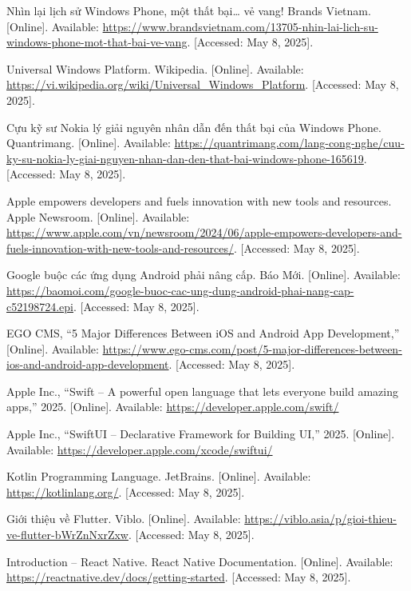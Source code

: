 \documentclass[12pt]{report}
\begin{document}
\begin{thebibliography}{1}
  Nhìn lại lịch sử Windows Phone, một thất bại… vẻ vang! Brands Vietnam. [Online]. Available: \url{https://www.brandsvietnam.com/13705-nhin-lai-lich-su-windows-phone-mot-that-bai-ve-vang}. [Accessed: May 8, 2025].


  Universal Windows Platform. Wikipedia. [Online]. Available: \url{https://vi.wikipedia.org/wiki/Universal_Windows_Platform}. [Accessed: May 8, 2025].


  Cựu kỹ sư Nokia lý giải nguyên nhân dẫn đến thất bại của Windows Phone. Quantrimang. [Online]. Available: \url{https://quantrimang.com/lang-cong-nghe/cuu-ky-su-nokia-ly-giai-nguyen-nhan-dan-den-that-bai-windows-phone-165619}. [Accessed: May 8, 2025].


  Apple empowers developers and fuels innovation with new tools and resources. Apple Newsroom. [Online]. Available: \url{https://www.apple.com/vn/newsroom/2024/06/apple-empowers-developers-and-fuels-innovation-with-new-tools-and-resources/}. [Accessed: May 8, 2025].

  Google buộc các ứng dụng Android phải nâng cấp. Báo Mới. [Online]. Available: \url{https://baomoi.com/google-buoc-cac-ung-dung-android-phai-nang-cap-c52198724.epi}. [Accessed: May 8, 2025].


  EGO CMS, “5 Major Differences Between iOS and Android App Development,” [Online]. Available: \url{https://www.ego-cms.com/post/5-major-differences-between-ios-and-android-app-development}. [Accessed: May 8, 2025].



  Apple Inc., ``Swift – A powerful open language that lets everyone build amazing apps,'' 2025. [Online]. Available: \url{https://developer.apple.com/swift/}

  Apple Inc., ``SwiftUI – Declarative Framework for Building UI,'' 2025. [Online]. Available: \url{https://developer.apple.com/xcode/swiftui/}

  Kotlin Programming Language. JetBrains. [Online]. Available: \url{https://kotlinlang.org/}. [Accessed: May 8, 2025].

  Giới thiệu về Flutter. Viblo. [Online]. Available: \url{https://viblo.asia/p/gioi-thieu-ve-flutter-bWrZnNxrZxw}. [Accessed: May 8, 2025].

  Introduction – React Native. React Native Documentation. [Online]. Available: \url{https://reactnative.dev/docs/getting-started}. [Accessed: May 8, 2025].


\end{thebibliography}
\end{document}
